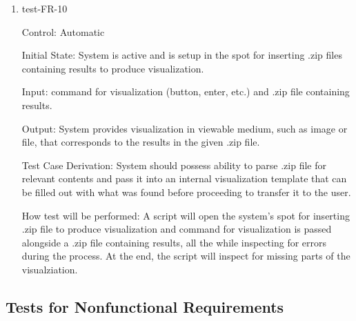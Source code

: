 \documentclass[12pt, titlepage]{article}
\begin{document}
\begin{enumerate}

\item{test-FR-10\\}

Control: Automatic
					
Initial State: System is active and is setup in the spot for inserting .zip 
files containing results to produce visualization.
					
Input: command for visualization (button, enter, etc.) and .zip file containing 
results.
					
Output: System provides visualization in viewable medium, such as image or file,
that corresponds to the results in the given .zip file.

Test Case Derivation: System should possess ability to parse .zip file for 
relevant contents and pass it into an internal visualization template that 
can be filled out with what was found before proceeding to transfer it to
the user.

How test will be performed: A script will open the system's spot for 
inserting .zip file to produce visualization and command for 
visualization is passed alongside a .zip file containing results, 
all the while inspecting for errors during the process. At the end, the 
script will inspect for missing parts of the visualziation.
\end{enumerate}

\subsection{Tests for Nonfunctional Requirements}



\end{document}
